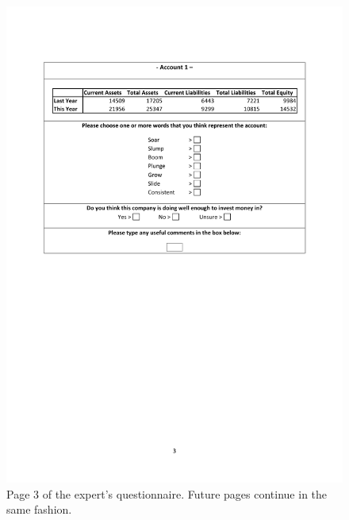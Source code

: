 \begin{figure}[ht]
\centering
\includegraphics[scale=0.6]{qa3}
\caption{Page 3 of the expert's questionnaire. Future pages continue in the same fashion.}
\label{fig:qa3}
\end{figure}

